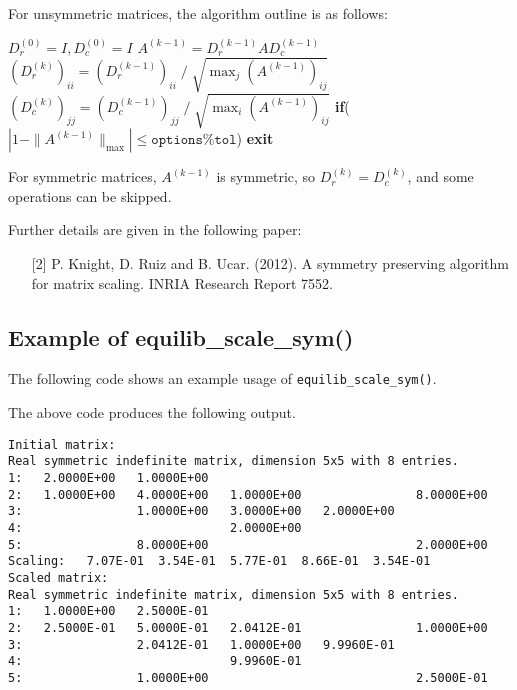 \noindent
For unsymmetric matrices, the algorithm outline is as follows:
\begin{algorithmic}
   \setlength{\itemsep}{2pt}
   \STATE $D_r^{(0)} = I, D_c^{(0)}=I$
      \setlength{\itemsep}{2pt}
      \STATE $A^{(k-1)} = D_r^{(k-1)} A D_c^{(k-1)}$
      \STATE $(D_r^{(k)})_{ii} = (D_r^{(k-1)})_{ii}\; /\; \sqrt{\max_j(A^{(k-1)})_{ij}}$
      \STATE $(D_c^{(k)})_{jj} = (D_c^{(k-1)})_{jj}\; /\; \sqrt{\max_i(A^{(k-1)})_{ij}}$
      \STATE\textbf{if}($|1-\|A^{(k-1)}\|_{\max}|\le\texttt{options\%tol}$) \textbf{exit}
   \ENDFOR
\end{algorithmic}
For symmetric matrices, $A^{(k-1)}$ is symmetric, so $D_r^{(k)} = D_c^{(k)}$, and
some operations can be skipped.

\vspace*{0.3cm}
\noindent
Further details are given in the following paper:
\vspace{-0.1cm}
\begin{itemize}
   \item[{[2]}] P. Knight, D. Ruiz and B. Ucar. (2012). A symmetry preserving algorithm for matrix scaling. INRIA Research Report 7552.
\end{itemize}

\subsection{Example of equilib\_scale\_sym()}
The following code shows an example usage of \texttt{equilib\_scale\_sym()}.

The above code produces the following output.
\begin{verbatim}
Initial matrix:
Real symmetric indefinite matrix, dimension 5x5 with 8 entries.
1:   2.0000E+00   1.0000E+00                                       
2:   1.0000E+00   4.0000E+00   1.0000E+00                8.0000E+00
3:                1.0000E+00   3.0000E+00   2.0000E+00             
4:                             2.0000E+00                          
5:                8.0000E+00                             2.0000E+00
Scaling:   7.07E-01  3.54E-01  5.77E-01  8.66E-01  3.54E-01
Scaled matrix:
Real symmetric indefinite matrix, dimension 5x5 with 8 entries.
1:   1.0000E+00   2.5000E-01                                       
2:   2.5000E-01   5.0000E-01   2.0412E-01                1.0000E+00
3:                2.0412E-01   1.0000E+00   9.9960E-01             
4:                             9.9960E-01                          
5:                1.0000E+00                             2.5000E-01
\end{verbatim}

